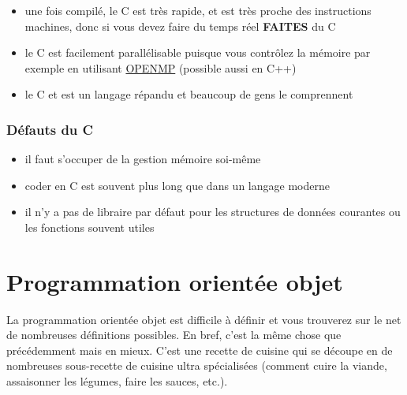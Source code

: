 \begin{itemize}
\item une fois compilé, le C est très rapide, et est très proche des instructions machines,
donc si  vous devez faire du temps réel \textbf{FAITES} du C
\item le C est facilement parallélisable puisque vous contrôlez la mémoire
par exemple en utilisant \href{http://openmp.org/}{OPENMP} (possible aussi en C++)
\item le C et est un langage répandu et beaucoup de gens le comprennent
\end{itemize}

\subsubsection*{Défauts du C}

\begin{itemize}
\item il faut s'occuper de la gestion mémoire soi-même
\item coder en C est souvent plus long que dans un langage moderne
\item il n'y a pas de libraire par défaut pour les structures de données courantes ou les fonctions souvent utiles
\end{itemize}

\section{Programmation orientée objet}

La programmation orientée objet est difficile à définir et vous trouverez sur le net de nombreuses 
définitions possibles. En bref, c'est la même chose que précédemment mais en mieux. C'est une recette de cuisine qui se 
découpe en de nombreuses sous-recette de cuisine ultra spécialisées (comment cuire la viande,
assaisonner les légumes, faire les sauces, etc.).\\


